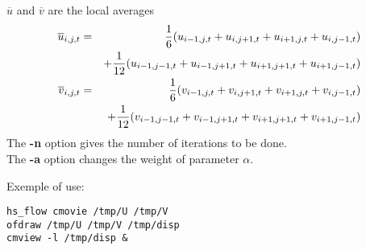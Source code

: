 $\overline{u}$ and $\overline{v}$ are the local averages
\begin{eqnarray*}
\overline{u}_{i,j,t} & = &\frac{1}{6}(u_{i-1,j,t} + u_{i,j+1,t} +u_{i+1,j,t} + u_{i,j-1,t})\\
&&+ \frac{1}{12}(u_{i-1,j-1,t} + u_{i-1,j+1,t} +u_{i+1,j+1,t} + u_{i+1,j-1,t}  )
\vspace*{0.3cm}\\
\overline{v}_{i,j,t} & = &\frac{1}{6}(v_{i-1,j,t} + v_{i,j+1,t} +v_{i+1,j,t} + v_{i,j-1,t})\\
&&+ \frac{1}{12}(v_{i-1,j-1,t} + v_{i-1,j+1,t} +v_{i+1,j+1,t} + v_{i+1,j-1,t}  )
\end{eqnarray*}
The {\bf{-n}} option gives the number of iterations to be done.\\
The {\bf{-a}} option changes the weight of parameter $\alpha$. 

\medskip

Exemple of use:
\begin{verbatim}
hs_flow cmovie /tmp/U /tmp/V
ofdraw /tmp/U /tmp/V /tmp/disp
cmview -l /tmp/disp &
\end{verbatim}



